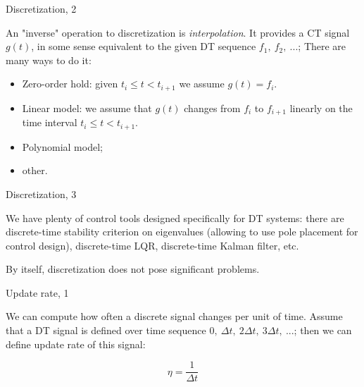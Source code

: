 \documentclass{beamer}
\begin{document}
\begin{frame}{Discretization, 2}
	\begin{flushleft}
		
		An "inverse" operation to discretization is  \emph{interpolation}. It provides a CT signal $g(t)$, in some sense equivalent to the given DT sequence $f_1, \ f_2, \ ...$; There are many ways to do it:
		
		\bigskip
		
		\begin{itemize}
			\item Zero-order hold: given $t_i \leq t < t_{i+1}$ we assume $g(t) = f_i$.
			
			\item Linear model: we assume that $g(t)$ changes from $f_i$ to $f_{i+1}$ linearly on the time interval $t_i \leq t < t_{i+1}$.
			
			\item Polynomial model;
			
			\item other.
			
		\end{itemize}
		
		
	\end{flushleft}
\end{frame}


\begin{frame}{Discretization, 3}
	\begin{flushleft}
		
		We have plenty of control tools designed specifically for DT systems: there are discrete-time stability criterion on eigenvalues (allowing to use pole placement for control design), discrete-time LQR, discrete-time Kalman filter, etc.
		
		\bigskip
		
		By itself, discretization does not pose significant problems. 
		
		
	\end{flushleft}
\end{frame}



\begin{frame}{Update rate, 1}
	\begin{flushleft}
		
		
		We can compute how often a discrete signal changes per unit of time. Assume that a DT signal is defined over time sequence $0, \ \Delta t, \ 2\Delta t, \ 3\Delta t, \ ...$; then we can define update rate of this signal:
		
		\begin{equation}
			\eta = \frac{1}{\Delta t}
		\end{equation}
		
	\end{flushleft}
\end{frame}
\end{document}
